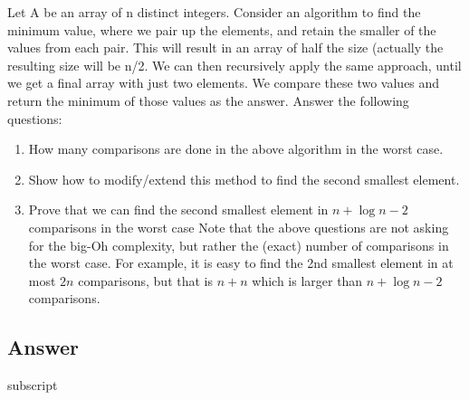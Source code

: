 \documentclass[
	12pt
]{fphw}
\begin{document}
\begin{problem}
	Let A be an array of n distinct integers. Consider an algorithm to find the minimum value, where we pair up the elements, and retain the smaller of the values from each pair. This will result in an array of half the size (actually the resulting size will be n/2. We can then recursively apply the same approach, until we get a final array with just two elements. We compare these two values and return the minimum of those values as the answer. Answer the following questions:
	
	
	
	
	\medskip
	
	\begin{enumerate}
		\item How many comparisons are done in the above algorithm in the worst case.
		\item Show how to modify/extend this method to find the second smallest element.
		\item Prove that we can find the second smallest element in $n + \log n - 2$ comparisons in the worst case Note that the above questions are not asking for the big-Oh complexity, but rather the (exact) number of comparisons in the worst case. For example, it is easy to find the 2nd smallest element in at most $2n$ comparisons, but that is $n + n$ which is larger than $n + \log n - 2$ comparisons.
	\end{enumerate}
\end{problem}


\subsection*{Answer} 

subscript

\end{document}
